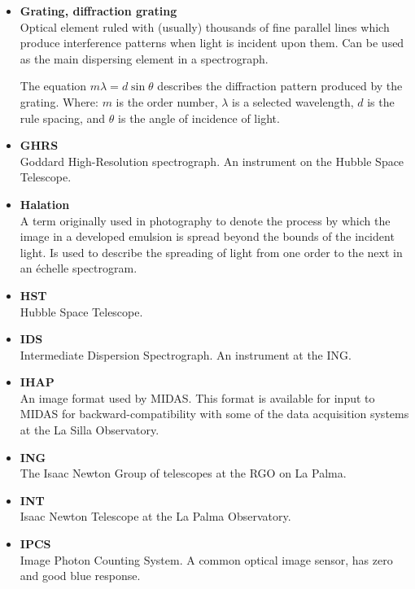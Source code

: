 \begin{itemize}
\item {\bf\label{gl_grating}Grating, diffraction grating}\\
      Optical element ruled with (usually) thousands of fine parallel
      lines which produce interference patterns when light is incident
      upon them.  Can be used as the main dispersing element in a
      spectrograph.

      The equation $m\lambda = d\sin\theta$ describes the diffraction
      pattern produced by the grating.  Where: $m$ is the order number,
      $\lambda$ is a selected wavelength, $d$ is the rule spacing, and
      $\theta$ is the angle of incidence of light.

\item {\bf\label{gl_ghrs}GHRS}\\
      Goddard High-Resolution spectrograph.  An instrument on the
      Hubble Space Telescope.

\item {\bf\label{gl_halation}Halation}\\
      A term originally used in photography to denote the process by which
      the image in a developed emulsion is spread beyond the bounds of the
      incident light.  Is used to describe the spreading of light from
      one order to the next in an \'{e}chelle spectrogram.

\item {\bf\label{gl_hst}HST}\\
      Hubble Space Telescope.

\item {\bf\label{gl_ids}IDS}\\
      Intermediate Dispersion Spectrograph.  An instrument at the
      ING\@.

\item {\bf\label{gl_ihap}IHAP}\\
      An image format used by MIDAS.  This format is available for
      input to MIDAS for backward-compatibility with some of the
      data acquisition systems at the La Silla Observatory.

\item {\bf\label{gl_ing}ING}\\
      The Isaac Newton Group of telescopes at the RGO on La Palma.

\item {\bf\label{gl_int}INT}\\
      Isaac Newton Telescope at the La Palma Observatory.

\item {\bf\label{gl_ipcs}IPCS}\\
      Image Photon Counting System.  A common optical image sensor,
      has zero  and good blue
      response.


\end{itemize}
